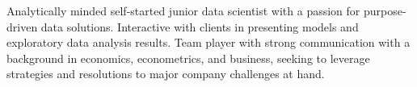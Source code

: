 \documentclass[letter,10pt]{article}
\begin{document}
\begin{justify}
Analytically minded self-started junior data scientist with a passion for purpose-driven data solutions. Interactive with clients in presenting models and exploratory data analysis results. Team player with strong communication with a background in economics, econometrics, and business, seeking to leverage strategies and resolutions to major company challenges at hand.
\end{justify}
\end{document}
